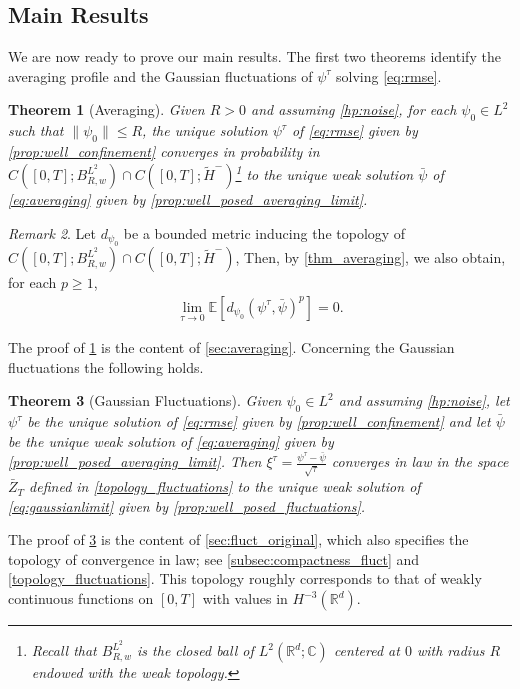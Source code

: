 \documentclass[a4paper,10pt]{amsart}
\newcommand{\C}{\mathbb{C}}
\newcommand{\R}{\mathbb{R}}
\newtheorem{theorem}{Theorem}[section]
\theoremstyle{remark}
\newtheorem{remark}[theorem]{Remark}
\numberwithin{equation}{section}
\begin{document}
\subsection{Main Results}\label{sub:main_results}
We are now ready to prove our main results. The first two theorems  identify the averaging profile and the Gaussian fluctuations of $\psi^{\tau}$ solving \eqref{eq:rmse}.
\begin{theorem}[Averaging]\label{thm_averaging}
    Given $R>0$ and assuming \cref{hp:noise}, for each $\psi_0\in L^2$ such that $\|\psi_0\|\leq R$, the unique solution $\psi^{\tau}$ of \eqref{eq:rmse} given by \cref{prop:well_confinement} converges in probability in $C([0,T];B^{L^2}_{R,w})
    \cap C([0,T];\tilde{H}^-)$\footnote{Recall that $B^{L^2}_{R,w}$ is the closed ball of $L^2(\R^d;\C)$ centered at $0$ with radius $R$ endowed with the weak topology.} to the unique weak solution $\bar{\psi}$ of \eqref{eq:averaging} given by \cref{prop:well_posed_averaging_limit}.
\end{theorem}
\begin{remark}
    Let $d_{\psi_0}$ be a bounded metric inducing the topology of $C([0,T];B^{L^2}_{R,w})
    \cap C([0,T];\tilde{H}^-)$, Then, by \autoref{thm_averaging}, we also obtain, for each $p\geq 1$,
    \begin{align*}
       \lim_{\tau\rightarrow 0} \mathbb{E}\left[d_{\psi_0}(\psi^\tau,\bar{\psi})^p\right]=0.
    \end{align*}
\end{remark}
The proof of \cref{thm_averaging} is the content of \cref{sec:averaging}. Concerning the Gaussian fluctuations the following holds.
\begin{theorem}[Gaussian Fluctuations]\label{thm_fluctuations}
    Given $\psi_0\in L^2$ and assuming \cref{hp:noise}, let $\psi^{\tau}$ be the unique solution of \eqref{eq:rmse} given by \cref{prop:well_confinement} and let $\bar{\psi}$ be the unique weak solution of \eqref{eq:averaging} given by \cref{prop:well_posed_averaging_limit}. Then $\xi^{\tau}=\frac{\psi^\tau-\bar{\psi}}{\sqrt{\tau}}$ converges in law in the space $\bar Z_T$ defined in \eqref{topology_fluctuations} to the unique weak solution of \eqref{eq:gaussianlimit} given by \cref{prop:well_posed_fluctuations}.
\end{theorem}
The proof of \cref{thm_fluctuations} is the content of
\cref{sec:fluct_original}, which also specifies the topology of convergence
in law; see \cref{subsec:compactness_fluct} and
\eqref{topology_fluctuations}. This topology roughly corresponds to that of
weakly continuous functions on $[0,T]$ with values in $H^{-3}(\R^d)$.
\end{document}
